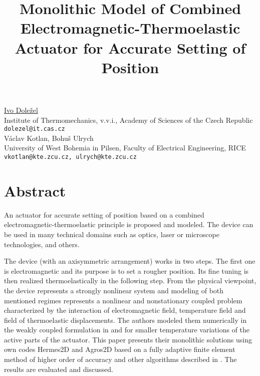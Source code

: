 \title{Monolithic Model of Combined Electromagnetic-Thermoelastic Actuator for Accurate Setting of Position}
\author{} \institute{}
\maketitle

\begin{center}
{\large \underline{Ivo Dole\v{z}el}}\\
Institute of Thermomechanics, v.v.i., Academy of Sciences of the Czech Republic\\
{\tt dolezel@it.cas.cz}
\vspace{4mm}\\

{\large V\'{a}clav Kotlan, Bohu\v{s} Ulrych}\\
University of West Bohemia in Pilsen, Faculty of Electrical Engineering, RICE\\
{\tt vkotlan@kte.zcu.cz, ulrych@kte.zcu.cz}\\
\end{center}

\section*{Abstract}
An actuator for accurate setting of position based on a combined electromagnetic-thermoelastic principle is proposed and modeled. The device can be used in many technical domains such as optics, laser or microscope technologies, and others.

The device (with an axisymmetric arrangement) works in two steps. The first one is electromagnetic and its purpose is to set a rougher position. Its fine tuning is then realized thermoelastically in the following step. From the physical viewpoint, the device represents a strongly nonlinear system and modeling of both mentioned regimes represents a nonlinear and nonstationary coupled problem characterized by the interaction of electromagnetic field, temperature field and field of thermoelastic displacements. The authors modeled them numerically in the weakly coupled formulation in \cite{EPNC} and \cite{Przeglad} for smaller
temperature variations of the active parts of the actuator. This paper presents their monolithic solutions using own codes Hermes2D and Agros2D \cite{Hermes2D} based on a fully adaptive finite element method of higher order of accuracy and other algorithms described in \cite{Solin}. The results are evaluated and discussed.

